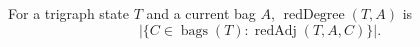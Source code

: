 For a trigraph state \(T\) and a current bag \(A\),
\(\operatorname{redDegree}(T,A)\) is
\[
  |\{C\in\operatorname{bags}(T) : \operatorname{redAdj}(T,A,C)\}|.
\]
